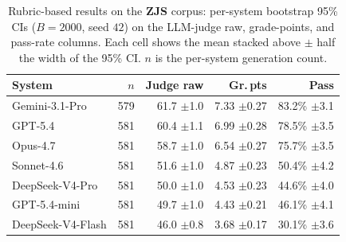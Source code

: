 \begin{table}[t]
\centering\footnotesize
\caption{Rubric-based results on the \textbf{ZJS} corpus: per-system bootstrap 95\% CIs ($B=2000$, seed $42$) on the LLM-judge raw, grade-points, and pass-rate columns. Each cell shows the mean stacked above $\pm$ half the width of the 95\% CI. $n$ is the per-system generation count.}
\label{tbl-full-results-rubric-zjs}
\setlength{\tabcolsep}{4pt}
\begin{tabular*}{\textwidth}{@{\extracolsep{\fill}}lrrrr@{}}
\toprule
System & $n$ & Judge raw & Gr.\,pts & Pass \\
\midrule
Gemini-3.1-Pro & 579 & \shortstack[r]{61.7\\{\scriptsize $\pm$1.0}} & \shortstack[r]{7.33\\{\scriptsize $\pm$0.27}} & \shortstack[r]{83.2\%\\{\scriptsize $\pm$3.1}} \\
GPT-5.4 & 581 & \shortstack[r]{60.4\\{\scriptsize $\pm$1.1}} & \shortstack[r]{6.99\\{\scriptsize $\pm$0.28}} & \shortstack[r]{78.5\%\\{\scriptsize $\pm$3.5}} \\
Opus-4.7 & 581 & \shortstack[r]{58.7\\{\scriptsize $\pm$1.0}} & \shortstack[r]{6.54\\{\scriptsize $\pm$0.27}} & \shortstack[r]{75.7\%\\{\scriptsize $\pm$3.5}} \\
Sonnet-4.6 & 581 & \shortstack[r]{51.6\\{\scriptsize $\pm$1.0}} & \shortstack[r]{4.87\\{\scriptsize $\pm$0.23}} & \shortstack[r]{50.4\%\\{\scriptsize $\pm$4.2}} \\
DeepSeek-V4-Pro & 581 & \shortstack[r]{50.0\\{\scriptsize $\pm$1.0}} & \shortstack[r]{4.53\\{\scriptsize $\pm$0.23}} & \shortstack[r]{44.6\%\\{\scriptsize $\pm$4.0}} \\
GPT-5.4-mini & 581 & \shortstack[r]{49.7\\{\scriptsize $\pm$1.0}} & \shortstack[r]{4.43\\{\scriptsize $\pm$0.21}} & \shortstack[r]{46.1\%\\{\scriptsize $\pm$4.1}} \\
DeepSeek-V4-Flash & 581 & \shortstack[r]{46.0\\{\scriptsize $\pm$0.8}} & \shortstack[r]{3.68\\{\scriptsize $\pm$0.17}} & \shortstack[r]{30.1\%\\{\scriptsize $\pm$3.6}} \\

\end{tabular*}
\end{table}
